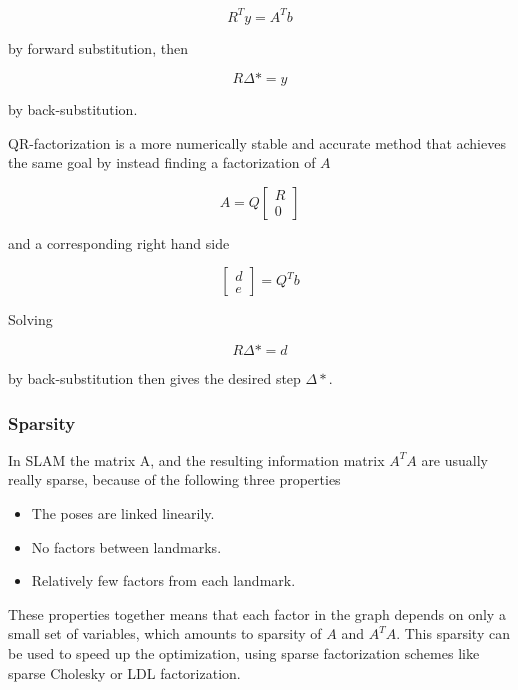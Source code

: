\begin{equation}
    R^Ty = A^Tb
\end{equation}

by forward substitution, then 

\begin{equation}
    R\Delta* = y
\end{equation}

by back-substitution. 

QR-factorization is a more numerically stable and accurate method that achieves the same goal by instead finding a factorization of $A$ 

\begin{equation}
    A = Q\begin{bmatrix} R \\ 0 \end{bmatrix}
\end{equation}

and a corresponding right hand side

\begin{equation}
    \begin{bmatrix} d \\ e \end{bmatrix} = Q^Tb
\end{equation}

Solving 

\begin{equation}
    R\Delta* = d
\end{equation}

by back-substitution then gives the desired step $\Delta*$.

\subsubsection{Sparsity}

In SLAM the matrix A, and the resulting information matrix $A^TA$ are usually really sparse, because of the following three properties

\begin{itemize}
    \item The poses are linked linearily.
    \item No factors between landmarks.
    \item Relatively few factors from each landmark.
\end{itemize}

These properties together means that each factor in the graph depends on only a small set of variables, which amounts to sparsity of $A$ and $A^TA$. This sparsity can be used to speed up the optimization, using sparse factorization schemes like sparse Cholesky or LDL factorization\cite{SparseLinearAlgebra}. 

